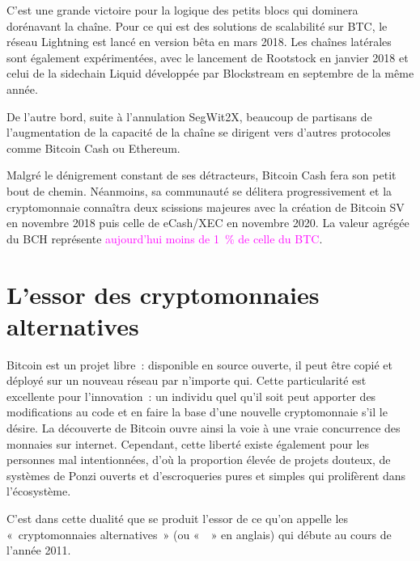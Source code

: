 C'est une grande victoire pour la logique des petits blocs qui dominera dorénavant la chaîne. Pour ce qui est des solutions de scalabilité sur BTC, le réseau Lightning est lancé en version bêta en mars 2018. Les chaînes latérales sont également expérimentées, avec le lancement de Rootstock en janvier 2018 et celui de la sidechain Liquid développée par Blockstream en septembre de la même année.

De l'autre bord, suite à l'annulation SegWit2X, beaucoup de partisans de l'augmentation de la capacité de la chaîne se dirigent vers d'autres protocoles comme Bitcoin Cash ou Ethereum. 

Malgré le dénigrement constant de ses détracteurs, Bitcoin Cash fera son petit bout de chemin. Néanmoins, sa communauté se délitera progressivement et la cryptomonnaie connaîtra deux scissions majeures avec la création de Bitcoin SV en novembre 2018 puis celle de eCash/XEC en novembre 2020. La valeur agrégée du BCH représente \textcolor{magenta}{aujourd'hui moins de 1~\% de celle du BTC}.

\section*{L'essor des cryptomonnaies alternatives}

Bitcoin est un projet libre~: disponible en source ouverte, il peut être copié et déployé sur un nouveau réseau par n'importe qui. Cette particularité est excellente pour l'innovation~: un individu quel qu'il soit peut apporter des modifications au code et en faire la base d'une nouvelle cryptomonnaie s'il le désire. La découverte de Bitcoin ouvre ainsi la voie à une vraie concurrence des monnaies sur internet. Cependant, cette liberté existe également pour les personnes mal intentionnées, d'où la proportion élevée de projets douteux, de systèmes de Ponzi ouverts et d'escroqueries pures et simples qui prolifèrent dans l'écosystème.

C'est dans cette dualité que se produit l'essor de ce qu'on appelle les «~cryptomonnaies alternatives~» (ou «~~» en anglais) qui débute au cours de l'année 2011. 

